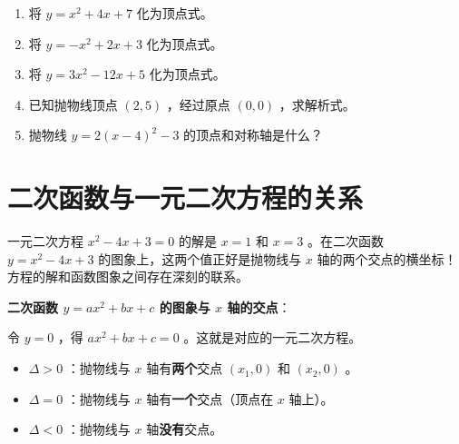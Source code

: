 \begin{practice}


\begin{enumerate}
  \item 将 $y = x^2 + 4x + 7$ 化为顶点式。
  \item 将 $y = -x^2 + 2x + 3$ 化为顶点式。
  \item 将 $y = 3x^2 - 12x + 5$ 化为顶点式。
  \item 已知抛物线顶点 $(2, 5)$ ，经过原点 $(0, 0)$ ，求解析式。
  \item 抛物线 $y = 2(x - 4)^2 - 3$ 的顶点和对称轴是什么？
\end{enumerate}


\end{practice}

\section*{二次函数与一元二次方程的关系}


\begin{explore}


一元二次方程 $x^2 - 4x + 3 = 0$ 的解是 $x = 1$ 和 $x = 3$ 。在二次函数 $y = x^2 - 4x + 3$ 的图象上，这两个值正好是抛物线与 $x$ 轴的两个交点的横坐标！方程的解和函数图象之间存在深刻的联系。

\end{explore}

\begin{understand}


\textbf{二次函数 $y = ax^2 + bx + c$ 的图象与 $x$ 轴的交点}：

令 $y = 0$ ，得 $ax^2 + bx + c = 0$ 。这就是对应的一元二次方程。

\begin{itemize}
  \item $\Delta > 0$ ：抛物线与 $x$ 轴有\textbf{两个}交点 $(x_1, 0)$ 和 $(x_2, 0)$ 。
  \item $\Delta = 0$ ：抛物线与 $x$ 轴有\textbf{一个}交点（顶点在 $x$ 轴上）。
  \item $\Delta < 0$ ：抛物线与 $x$ 轴\textbf{没有}交点。
\end{itemize}


\end{understand}

